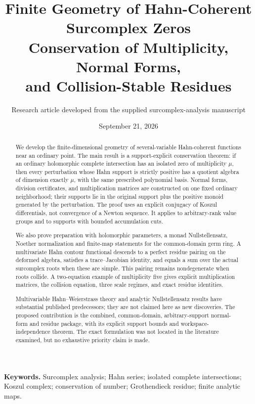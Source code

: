 \documentclass[11pt]{article}
\title{\textbf{Finite Geometry of Hahn-Coherent\\ Surcomplex Zeros}\\[0.6em]
\large Conservation of Multiplicity, Normal Forms,\\ and Collision-Stable Residues}
\author{Research article developed from the supplied surcomplex-analysis manuscript}
\date{September 21, 2026}
\theoremstyle{definition}
\begin{document}
\maketitle
\begin{abstract}
We develop the finite-dimensional geometry of several-variable Hahn-coherent functions near an ordinary point. The main result is a support-explicit conservation theorem: if an ordinary holomorphic complete intersection has an isolated zero of multiplicity $\mu$, then every perturbation whose Hahn support is strictly positive has a quotient algebra of dimension exactly $\mu$, with the same prescribed polynomial basis. Normal forms, division certificates, and multiplication matrices are constructed on one fixed ordinary neighborhood; their supports lie in the original support plus the positive monoid generated by the perturbation. The proof uses an explicit conjugacy of Koszul differentials, not convergence of a Newton sequence. It applies to arbitrary-rank value groups and to supports with bounded accumulation cuts.

We also prove preparation with holomorphic parameters, a monad Nullstellensatz, Noether normalization and finite-map statements for the common-domain germ ring. A multivariate Hahn contour functional descends to a perfect residue pairing on the deformed algebra, satisfies a trace--Jacobian identity, and equals a sum over the actual surcomplex roots when these are simple. This pairing remains nondegenerate when roots collide. A two-equation example of multiplicity five gives explicit multiplication matrices, the collision equation, three scale regimes, and exact residue identities.

Multivariable Hahn--Weierstrass theory and analytic Nullstellensatz results have substantial published predecessors; they are not claimed here as new discoveries. The proposed contribution is the combined, common-domain, arbitrary-support normal-form and residue package, with its explicit support bounds and workspace-independence theorem. The exact formulation was not located in the literature examined, but no exhaustive priority claim is made.
\end{abstract}
\vspace{0.5em}
\noindent\textbf{Keywords.} Surcomplex analysis; Hahn series; isolated complete intersections; Koszul complex; conservation of number; Grothendieck residue; finite analytic maps.
\clearpage
\begingroup
\fontsize{9.6}{11.3}\selectfont
\setlength{\parskip}{0pt}
\tableofcontents
\endgroup
\clearpage
\end{document}
